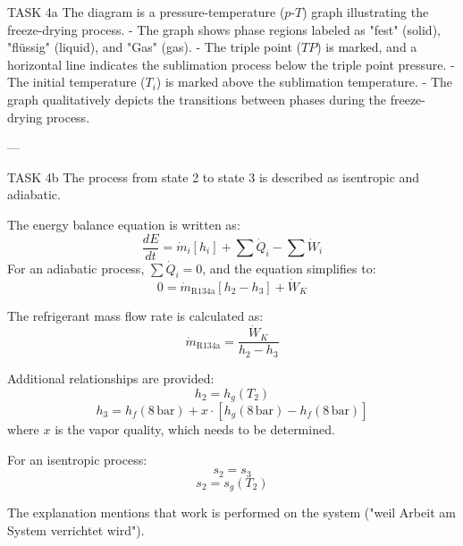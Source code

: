 TASK 4a  
The diagram is a pressure-temperature (\(p\)-\(T\)) graph illustrating the freeze-drying process.  
- The graph shows phase regions labeled as "fest" (solid), "flüssig" (liquid), and "Gas" (gas).  
- The triple point (\(TP\)) is marked, and a horizontal line indicates the sublimation process below the triple point pressure.  
- The initial temperature (\(T_i\)) is marked above the sublimation temperature.  
- The graph qualitatively depicts the transitions between phases during the freeze-drying process.

---

TASK 4b  
The process from state 2 to state 3 is described as isentropic and adiabatic.  

The energy balance equation is written as:  
\[
\frac{dE}{dt} = \dot{m}_i [h_i] + \sum \dot{Q}_i - \sum \dot{W}_i
\]  
For an adiabatic process, \(\sum \dot{Q}_i = 0\), and the equation simplifies to:  
\[
0 = \dot{m}_{\text{R134a}} [h_2 - h_3] + \dot{W}_K
\]  

The refrigerant mass flow rate is calculated as:  
\[
\dot{m}_{\text{R134a}} = \frac{\dot{W}_K}{h_2 - h_3}
\]  

Additional relationships are provided:  
\[
h_2 = h_g(T_2)
\]  
\[
h_3 = h_f(8 \, \text{bar}) + x \cdot [h_g(8 \, \text{bar}) - h_f(8 \, \text{bar})]
\]  
where \(x\) is the vapor quality, which needs to be determined.  

For an isentropic process:  
\[
s_2 = s_3
\]  
\[
s_2 = s_g(T_2)
\]  

The explanation mentions that work is performed on the system ("weil Arbeit am System verrichtet wird").